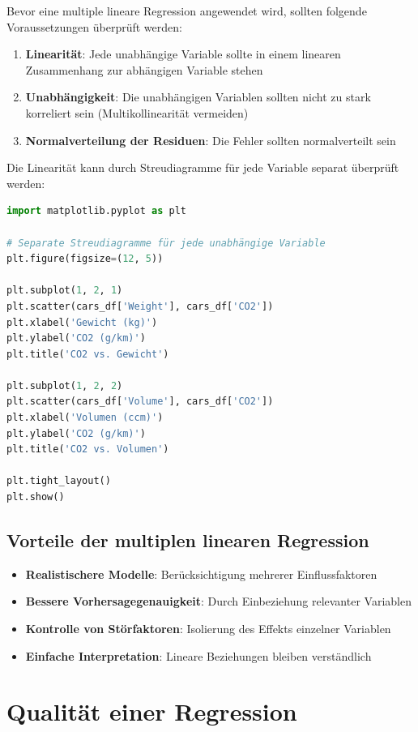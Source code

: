 Bevor eine multiple lineare Regression angewendet wird, sollten folgende Voraussetzungen überprüft werden:

\begin{enumerate}
	\item \textbf{Linearität}: Jede unabhängige Variable sollte in einem linearen Zusammenhang zur abhängigen Variable stehen
	\item \textbf{Unabhängigkeit}: Die unabhängigen Variablen sollten nicht zu stark korreliert sein (Multikollinearität vermeiden)
	\item \textbf{Normalverteilung der Residuen}: Die Fehler sollten normalverteilt sein
\end{enumerate}

Die Linearität kann durch Streudiagramme für jede Variable separat überprüft werden:

\begin{lstlisting}[language=Python]
import matplotlib.pyplot as plt

# Separate Streudiagramme für jede unabhängige Variable
plt.figure(figsize=(12, 5))

plt.subplot(1, 2, 1)
plt.scatter(cars_df['Weight'], cars_df['CO2'])
plt.xlabel('Gewicht (kg)')
plt.ylabel('CO2 (g/km)')
plt.title('CO2 vs. Gewicht')

plt.subplot(1, 2, 2)
plt.scatter(cars_df['Volume'], cars_df['CO2'])
plt.xlabel('Volumen (ccm)')
plt.ylabel('CO2 (g/km)')
plt.title('CO2 vs. Volumen')

plt.tight_layout()
plt.show()
\end{lstlisting}

\subsection{Vorteile der multiplen linearen Regression}

\begin{itemize}
	\item \textbf{Realistischere Modelle}: Berücksichtigung mehrerer Einflussfaktoren
	\item \textbf{Bessere Vorhersagegenauigkeit}: Durch Einbeziehung relevanter Variablen
	\item \textbf{Kontrolle von Störfaktoren}: Isolierung des Effekts einzelner Variablen
	\item \textbf{Einfache Interpretation}: Lineare Beziehungen bleiben verständlich
\end{itemize}

\section{Qualität einer Regression}

